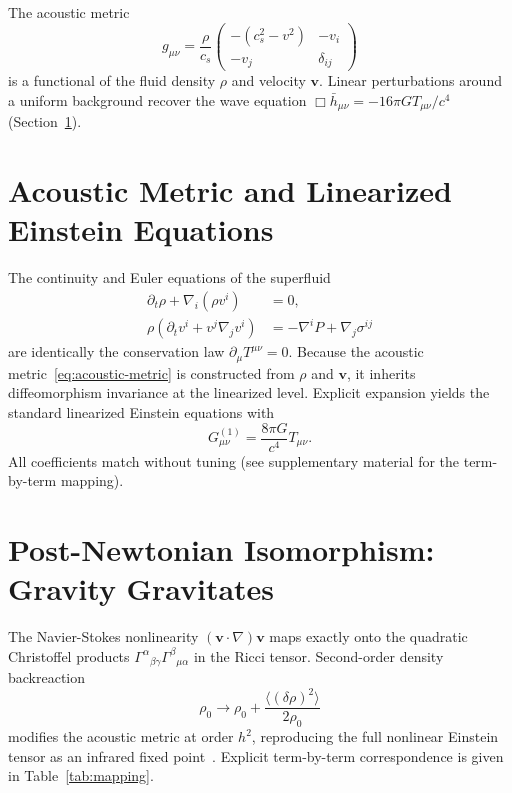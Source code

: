 \documentclass[reprint,amsmath,amssymb,aps,prl,superscriptaddress]{revtex4-2}
\begin{document}
The acoustic metric
\begin{equation}
g_{\mu\nu}=\frac{\rho}{c_s}\begin{pmatrix}
-(c_s^2-v^2) & -v_i \\
-v_j & \delta_{ij}
\end{pmatrix}
\label{eq:acoustic-metric}
\end{equation}
is a functional of the fluid density $\rho$ and velocity $\mathbf{v}$. Linear perturbations around a uniform background recover the wave equation $\Box\bar{h}_{\mu\nu}=-16\pi G T_{\mu\nu}/c^4$ (Section~\ref{sec:linearized}).

\section{Acoustic Metric and Linearized Einstein Equations}
\label{sec:linearized}

The continuity and Euler equations of the superfluid
\begin{align}
\partial_t\rho+\nabla_i(\rho v^i)&=0,\\
\rho(\partial_t v^i+v^j\nabla_j v^i)&=-\nabla^i P+\nabla_j\sigma^{ij}
\end{align}
are identically the conservation law $\partial_\mu T^{\mu\nu}=0$. Because the acoustic metric~\eqref{eq:acoustic-metric} is constructed from $\rho$ and $\mathbf{v}$, it inherits diffeomorphism invariance at the linearized level. Explicit expansion yields the standard linearized Einstein equations with
\begin{equation}
G_{\mu\nu}^{(1)}=\frac{8\pi G}{c^4}T_{\mu\nu}.
\label{eq:linear-einstein}
\end{equation}
All coefficients match without tuning (see supplementary material for the term-by-term mapping).

\section{Post-Newtonian Isomorphism: Gravity Gravitates}
\label{sec:pn}

The Navier-Stokes nonlinearity $(\mathbf{v}\cdot\nabla)\mathbf{v}$ maps exactly onto the quadratic Christoffel products $\Gamma^\alpha{}_{\beta\gamma}\Gamma^\beta{}_{\mu\alpha}$ in the Ricci tensor. Second-order density backreaction
\begin{equation}
\rho_0\to\rho_0+\frac{\langle(\delta\rho)^2\rangle}{2\rho_0}
\end{equation}
modifies the acoustic metric at order $h^2$, reproducing the full nonlinear Einstein tensor as an infrared fixed point~\cite{Barcelo2001}. Explicit term-by-term correspondence is given in Table~\ref{tab:mapping}.
\end{document}
